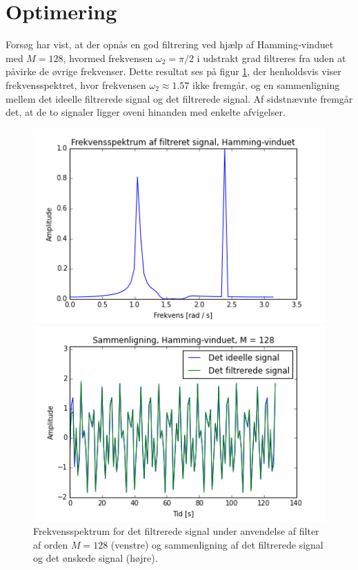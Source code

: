 \section{Optimering}
Forsøg har vist, at der opnås en god filtrering ved hjælp af Hamming-vinduet med $M=128$, hvormed frekvensen $\omega_2 = \pi/2$ i udstrakt grad filtreres fra uden at påvirke de øvrige frekvenser. Dette resultat ses på figur \ref{fig:resultat}, der henholdsvis viser frekvensspektret, hvor frekvensen $\omega_2 \approx 1.57$ ikke fremgår, og en sammenligning mellem det ideelle filtrerede signal og det filtrerede signal. Af sidstnævnte fremgår det, at de to signaler ligger oveni hinanden med enkelte afvigelser.
\begin{figure}[H]
\begin{minipage}{0.49\textwidth}
\centering
\includegraphics[width=\textwidth]{figures/Filter/freq_filt_signal_Hamming.png}
\end{minipage}
\begin{minipage}{0.49\textwidth}
\centering
\includegraphics[width=\textwidth]{figures/Filter/signal_compare_Hamming.png}
\end{minipage}
\caption{Frekvensspektrum for det filtrerede signal under anvendelse af filter af orden $M=128$ (venstre) og sammenligning af det filtrerede signal og det ønskede signal (højre).}
\label{fig:resultat}
\end{figure}

